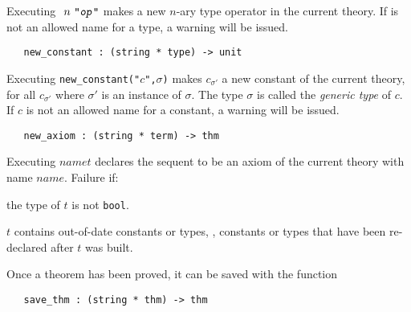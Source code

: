 \noindent Executing $\ n\ \ml{"\ty{op}"}$ makes 
a new $n$-ary type operator in the current theory. If
 is not an allowed name for a type, a warning will be issued.


\begin{holboxed}
\begin{verbatim}
   new_constant : (string * type) -> unit
\end{verbatim}
\end{holboxed}

\noindent Executing {\small\verb+new_constant("+}$c${\small\verb+",+}$\sigma${\small\verb+)+} makes
$c_{\sigma'}$ a new constant of the current theory,
for all $c_{\sigma'}$ where $\sigma'$ is an instance of $\sigma$.
The type $\sigma$ is
called the {\it generic type\/} of $c$.
If $c$ is not an allowed name for a constant, a warning will be issued.

\begin{holboxed}
\begin{verbatim}
   new_axiom : (string * term) -> thm
\end{verbatim}
\end{holboxed}

\noindent Executing $name$$t$\ml{)} declares the
sequent
 to be an axiom of the current theory with name $name$.
Failure if:
\begin{myenumerate}
\item the type of $t$ is not \verb+bool+.

\item $t$ contains out-of-date constants or types, \ie, constants or
  types that have been re-declared after $t$ was built.
\end{myenumerate}

Once a theorem has been proved, it can be saved with the function

\begin{holboxed}
\begin{verbatim}
   save_thm : (string * thm) -> thm
\end{verbatim}
\end{holboxed}

